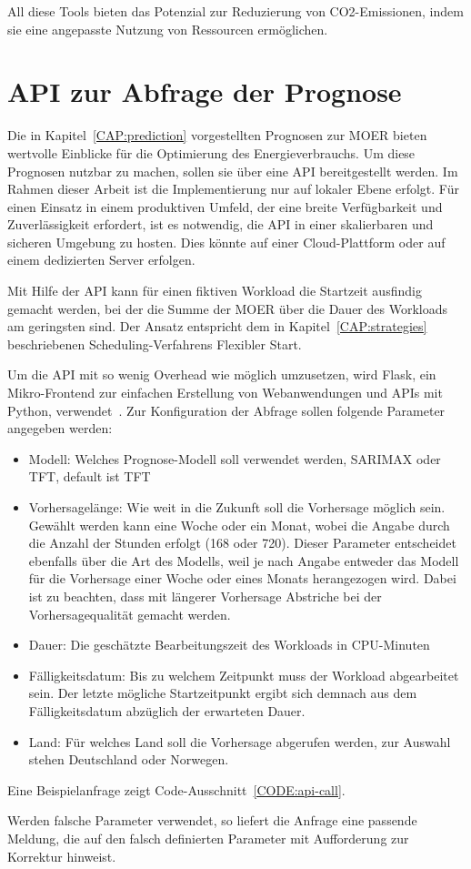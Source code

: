 All diese Tools bieten das Potenzial zur Reduzierung von CO2-Emissionen, indem sie eine angepasste Nutzung von Ressourcen ermöglichen.

\section{API zur Abfrage der Prognose}
Die in Kapitel~\ref{CAP:prediction} vorgestellten Prognosen zur \ac{MOER} bieten wertvolle Einblicke für die Optimierung des Energieverbrauchs.
Um diese Prognosen nutzbar zu machen, sollen sie über eine \ac{API} bereitgestellt werden.
Im Rahmen dieser Arbeit ist die Implementierung nur auf lokaler Ebene erfolgt.
Für einen Einsatz in einem produktiven Umfeld, der eine breite Verfügbarkeit und Zuverlässigkeit erfordert, ist es notwendig, die \ac{API} in einer skalierbaren und sicheren Umgebung zu hosten.
Dies könnte auf einer Cloud-Plattform oder auf einem dedizierten Server erfolgen.

Mit Hilfe der \ac{API} kann für einen fiktiven Workload die Startzeit ausfindig gemacht werden, bei der die Summe der \ac{MOER} über die Dauer des Workloads am geringsten sind.
Der Ansatz entspricht dem in Kapitel~\ref{CAP:strategies} beschriebenen Scheduling-Verfahrens \glqq Flexibler Start\grqq{}.

Um die \ac{API} mit so wenig Overhead wie möglich umzusetzen, wird Flask, ein Mikro-Frontend zur einfachen Erstellung von Webanwendungen und \acp{API} mit Python, verwendet~\cite{.20240203T21:13:11.000Z}.
Zur Konfiguration der Abfrage sollen folgende Parameter angegeben werden:
\begin{itemize}
 \item Modell: Welches Prognose-Modell soll verwendet werden, \ac{SARIMAX} oder \ac{TFT}, default ist \ac{TFT}
 \item Vorhersagelänge: Wie weit in die Zukunft soll die Vorhersage möglich sein.
 Gewählt werden kann eine Woche oder ein Monat, wobei die Angabe durch die Anzahl der Stunden erfolgt (168 oder 720).
 Dieser Parameter entscheidet ebenfalls über die Art des Modells, weil je nach Angabe entweder das Modell für die Vorhersage einer Woche oder eines Monats herangezogen wird.
 Dabei ist zu beachten, dass mit längerer Vorhersage Abstriche bei der Vorhersagequalität gemacht werden.
 \item Dauer: Die geschätzte Bearbeitungszeit des Workloads in \ac{CPU}-Minuten
 \item Fälligkeitsdatum: Bis zu welchem Zeitpunkt muss der Workload abgearbeitet sein.
 Der letzte mögliche Startzeitpunkt ergibt sich demnach aus dem Fälligkeitsdatum abzüglich der erwarteten Dauer.
 \item Land: Für welches Land soll die Vorhersage abgerufen werden, zur Auswahl stehen Deutschland oder Norwegen.
\end{itemize}
Eine Beispielanfrage zeigt Code-Ausschnitt~\ref{CODE:api-call}.

Werden falsche Parameter verwendet, so liefert die Anfrage eine passende Meldung, die auf den falsch definierten Parameter mit Aufforderung zur Korrektur hinweist.

